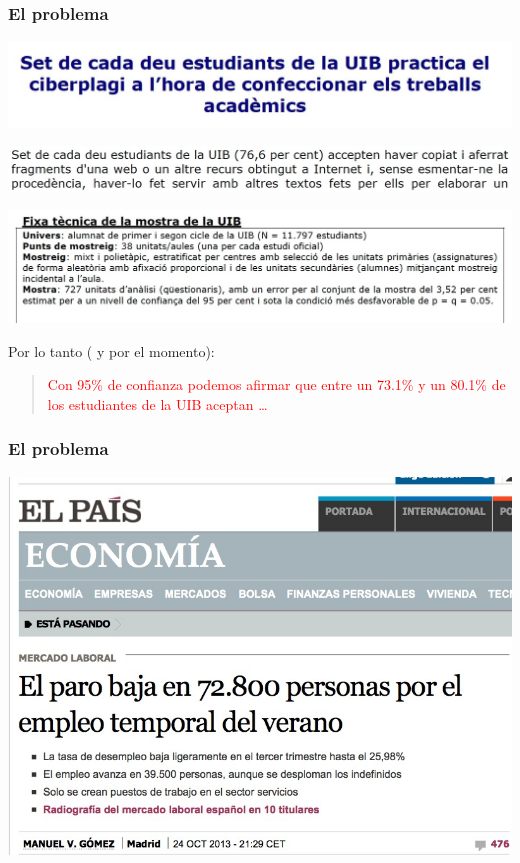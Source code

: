 \documentclass[12pt,t]{beamer}
\newcommand{\red}[1]{\textcolor{red}{#1}}
\theoremstyle{plain}
\theoremstyle{definition}
\begin{document}
\begin{frame}
\frametitle{El problema}
\vspace*{-1cm}

\begin{center}
\hspace*{-0.5cm}
\includegraphics[width=1.1\linewidth]{plagiUIB1.jpg}\medskip

\hspace*{-0.4cm}
\includegraphics[width=1.05\linewidth]{plagiUIB3.jpg}\medskip

\hspace*{-0.5cm}\includegraphics[width=1.1\linewidth]{plagiUIB2.jpg}
\end{center}
\vspace*{-1ex}

Por lo tanto ( y por el momento):
\begin{quote}
\red{Con 95\% de confianza podemos afirmar que entre un 73.1\% y un 80.1\% de los estudiantes de la UIB aceptan \ldots}
\end{quote}
\end{frame}


\begin{frame}
\frametitle{El problema}
\vspace*{-0.5cm}

\begin{center}
\includegraphics[width=1\linewidth]{EPA3}
\end{center}
\end{frame}
\end{document}
